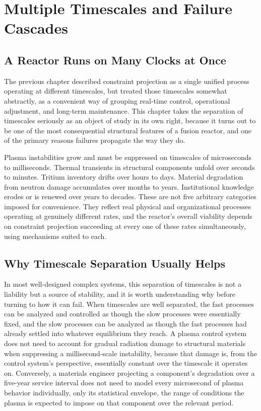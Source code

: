 \chapter{Multiple Timescales and Failure Cascades}

\section{A Reactor Runs on Many Clocks at Once}

The previous chapter described constraint projection as a single unified process operating at different timescales, but treated those timescales somewhat abstractly, as a convenient way of grouping real-time control, operational adjustment, and long-term maintenance. This chapter takes the separation of timescales seriously as an object of study in its own right, because it turns out to be one of the most consequential structural features of a fusion reactor, and one of the primary reasons failures propagate the way they do.

Plasma instabilities grow and must be suppressed on timescales of microseconds to milliseconds. Thermal transients in structural components unfold over seconds to minutes. Tritium inventory drifts over hours to days. Material degradation from neutron damage accumulates over months to years. Institutional knowledge erodes or is renewed over years to decades. These are not five arbitrary categories imposed for convenience. They reflect real physical and organizational processes operating at genuinely different rates, and the reactor's overall viability depends on constraint projection succeeding at every one of these rates simultaneously, using mechanisms suited to each.

\section{Why Timescale Separation Usually Helps}

In most well-designed complex systems, this separation of timescales is not a liability but a source of stability, and it is worth understanding why before turning to how it can fail. When timescales are well separated, the fast processes can be analyzed and controlled as though the slow processes were essentially fixed, and the slow processes can be analyzed as though the fast processes had already settled into whatever equilibrium they reach. A plasma control system does not need to account for gradual radiation damage to structural materials when suppressing a millisecond-scale instability, because that damage is, from the control system's perspective, essentially constant over the timescale it operates on. Conversely, a materials engineer projecting a component's degradation over a five-year service interval does not need to model every microsecond of plasma behavior individually, only its statistical envelope, the range of conditions the plasma is expected to impose on that component over the relevant period.

